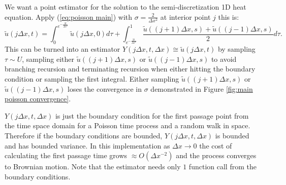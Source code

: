 \documentclass[a4paper,12pt]{article}
\begin{document}
\begin{example} \label{ex: point estimator of semi heat}
  We want a point estimator for the solution to the semi-discretization 1D heat equation. Apply (\ref{eq:poisson main})
  with $\sigma = \frac{2}{\Delta x^{2}}$ at interior point $j$ this is:
  \begin{equation}
    \tilde{u}(j \Delta x,t) = \int_{0}^{e^{-\frac{2t}{\Delta x^{2}}}}  \tilde{u}(j \Delta x,0) d\tau+
    \int_{e^{-\frac{2t}{\Delta x^{2}}}}^{1} \frac{\tilde{u}((j+1) \Delta x,s)+\tilde{u}((j-1) \Delta x,s)}{2}d\tau. \label{eq:int semi heat}
  \end{equation}
  This can be turned into an estimator $Y(j \Delta x,t,\Delta x ) \cong  \tilde{u}(j \Delta x,t)$
  by sampling $\tau \sim U$,
  sampling either $\tilde{u}((j+1) \Delta x,s)$ or $\tilde{u}((j-1) \Delta x,s)$ to avoid branching recursion and
  terminating recursion when either hitting the boundary condition or sampling the first integral. Either sampling
  $\tilde{u}((j+1) \Delta x,s)$ or $\tilde{u}((j-1) \Delta x,s)$ loses
  the convergence in $\sigma$ demonstrated in Figure \ref{fig:main poisson convergence}.
\end{example}

\begin{julia}\label{jl:point estimator heat}


  $Y(j \Delta x,t,\Delta x )$ is just the boundary condition
  for the first passage point from the time space domain for a Poisson time process and a random walk in space.
  Therefore if the boundary conditions are bounded, $Y(j \Delta x,t,\Delta x )$ is bounded and has bounded variance.
  In this implementation as  $\Delta x \rightarrow 0$  the cost of calculating the first passage time grows
  $\approx O(\Delta x ^{-2})$ and the process converges to Brownian motion. Note that the estimator needs
  only $1$ function call from the boundary conditions.

\end{julia}
\end{document}
